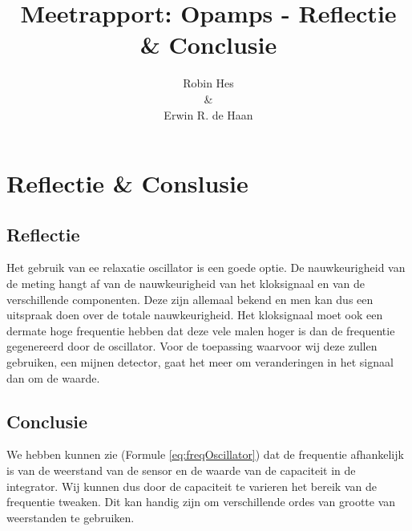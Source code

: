 \documentclass{report}
\title{Meetrapport: Opamps - Reflectie \& Conclusie}
\author{Robin Hes\\\&\\Erwin R. de Haan}
\begin{document}
\chapter{Reflectie \& Conslusie}
\section{Reflectie}
Het gebruik van ee relaxatie oscillator is een goede optie. De nauwkeurigheid van de meting hangt af van de nauwkeurigheid van het kloksignaal en van de verschillende componenten. Deze zijn allemaal bekend en men kan dus een uitspraak doen over de totale nauwkeurigheid. Het kloksignaal moet ook een dermate hoge frequentie hebben dat deze vele malen hoger is dan de frequentie gegenereerd door de oscillator. Voor de toepassing waarvoor wij deze zullen gebruiken, een mijnen detector, gaat het meer om veranderingen in het signaal dan om de waarde.
\section{Conclusie}
We hebben kunnen zie (Formule \ref{eq:freqOscillator}) dat de frequentie afhankelijk is van de weerstand van de sensor en de waarde van de capaciteit in de integrator. Wij kunnen dus door de capaciteit te varieren het bereik van de frequentie tweaken. Dit kan handig zijn om verschillende ordes van grootte van weerstanden te gebruiken.
\end{document}

